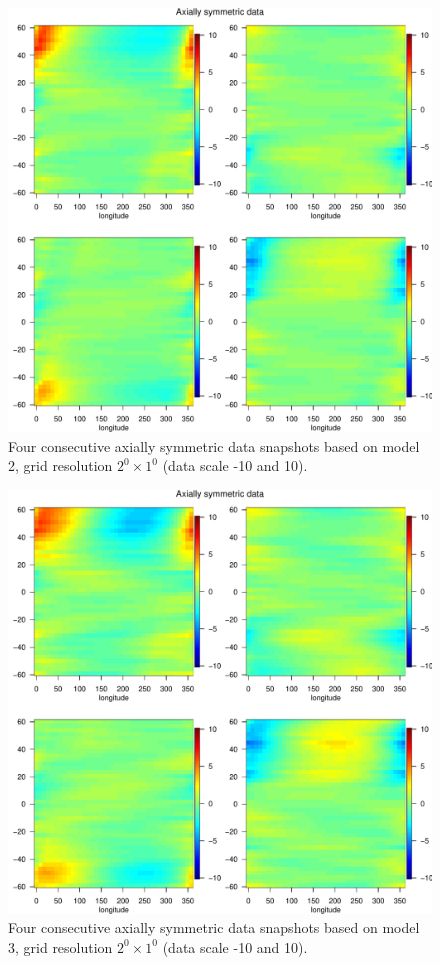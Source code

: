\begin{figure}[H]
	\label{grid_plot_model2}
	\begin{center}
		\includegraphics [scale=.8]{graphs/Data_sample_120_model2.pdf}
		\caption{Four consecutive axially symmetric data snapshots based on model 2, grid resolution $2^0\times 1^0$ (data scale -10 and 10).}
	\end{center}
\end{figure}


\begin{figure}[H]
\label{grid_plot_model3}
\begin{center}
\includegraphics [scale=.8]{graphs/Data_sample_120_model3.pdf}
\caption*{Four consecutive axially symmetric data snapshots based on model 3, grid resolution $2^0\times 1^0$ (data scale -10 and 10).}
\end{center}
\end{figure}
